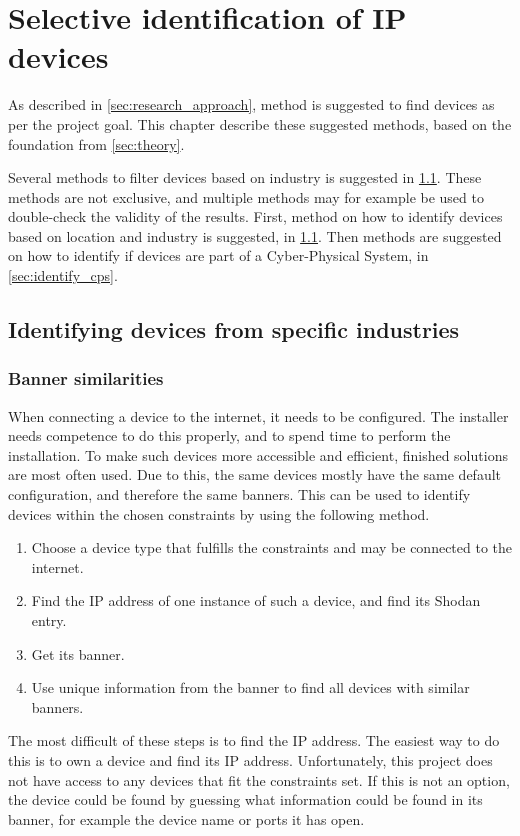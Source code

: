 \section{Selective identification of IP devices} \label{sec:method}
As described in \cref{sec:research_approach}, method is suggested to find devices as per the project goal. 
This chapter describe these suggested methods, based on the foundation from \cref{sec:theory}.

Several methods to filter devices based on industry is suggested in \cref{sec:identify_industry}. These methods are not exclusive, and multiple methods may for example be used to double-check the validity of the results. First, method on how to identify devices based on location and industry is suggested, in \cref{sec:identify_industry}. Then methods are suggested on how to identify if devices are part of a Cyber-Physical System, in \cref{sec:identify_cps}.


\subsection{Identifying devices from specific industries} \label{sec:identify_industry}
\subsubsection{Banner similarities} \label{sec:banner_method}
When connecting a device to the internet, it needs to be configured. The installer needs competence to do this properly, and to spend time to perform the installation. To make such devices more accessible and efficient, finished solutions are most often used. Due to this, the same devices mostly have the same default configuration, and therefore the same banners. This can be used to identify devices within the chosen constraints by using the following method.
\begin{enumerate}
    \item Choose a device type that fulfills the constraints and may be connected to the internet.
    \item Find the IP address of one instance of such a device, and find its Shodan entry.
    \item Get its banner.
    \item Use unique information from the banner to find all devices with similar banners.
\end{enumerate}
The most difficult of these steps is to find the IP address. The easiest way to do this is to own a device and find its IP address. Unfortunately, this project does not have access to any devices that fit the constraints set.
If this is not an option, the device could be found by guessing what information could be found in its banner, for example the device name or ports it has open.



